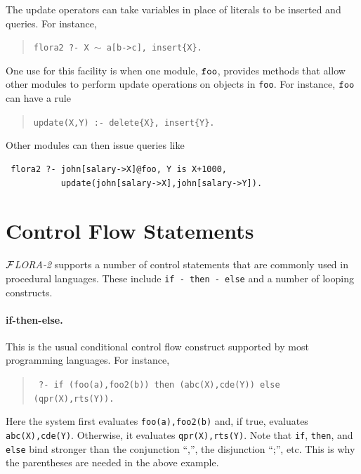 \documentclass[11pt]{article}
\newcommand{\FLORA}{{\mbox{${\cal F}${\small\it LORA}\rm\emph{-2}}}\xspace}
\begin{document}
The update operators can take variables in place of literals to be inserted
and queries. For instance, 
\begin{quote}
 {\tt flora2 ?-  X $\sim$ a[b->c], insert\{X\}.}
\end{quote}
One use for this facility is when one module, $\tt foo$, provides methods that
allow other modules to perform update operations on objects in {\tt foo}.
For instance, $\tt foo$ can have a rule
\begin{quote}
 {\tt update(X,Y) :- delete\{X\}, insert\{Y\}.}  
\end{quote}
Other modules can then issue queries like
\begin{verbatim}
 flora2 ?- john[salary->X]@foo, Y is X+1000,
           update(john[salary->X],john[salary->Y]).  
\end{verbatim}

\section{Control Flow Statements}\label{sec:control}

\FLORA supports a number of control statements that are commonly used in
procedural languages. These include {\tt if - then - else} and 
a number of looping constructs.

\paragraph{if-then-else.}
This is the usual conditional control flow
construct supported by most programming languages.  For instance,
\begin{quote}
 \tt
 ?- if (foo(a),foo2(b)) then (abc(X),cde(Y)) else (qpr(X),rts(Y)).
\end{quote}
Here the system first evaluates {\tt foo(a),foo2(b)} and, if true,
evaluates {\tt abc(X),cde(Y)}. Otherwise, it evaluates {\tt qpr(X),rts(Y)}.
Note that {\tt if}, {\tt then}, and {\tt else}
bind stronger than the conjunction ``,'', the
disjunction ``;'', etc. This is why the parentheses are needed in the above
example.
\end{document}
